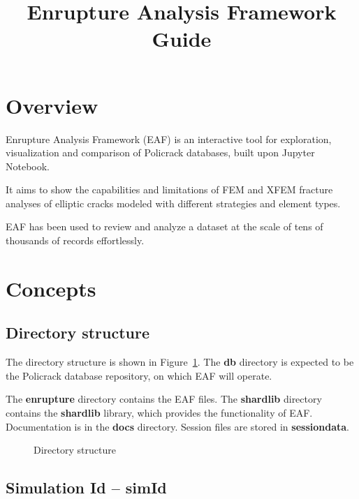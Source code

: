 \documentclass[10pt,a4paper]{article}
\begin{document}
\title{Enrupture Analysis Framework\\
Guide}
\maketitle
\vfill
\tableofcontents
\clearpage

\section{Overview}

Enrupture Analysis Framework (EAF) is an interactive tool for exploration, visualization and comparison of Policrack databases, built upon Jupyter Notebook.

It aims to show the capabilities and limitations of FEM and XFEM fracture analyses of elliptic cracks modeled with different strategies and element types.

EAF has been used to review and analyze a dataset at the scale of tens of thousands of records effortlessly.


\section{Concepts}

\subsection{Directory structure}

The directory structure is shown in Figure~\ref{directories}. The \textbf{db} directory is expected to be the Policrack database repository, on which EAF will operate.

The \textbf{enrupture} directory contains the EAF files. The \textbf{shardlib} directory contains the \textbf{shardlib} library, which provides the functionality of EAF. Documentation is in the \textbf{docs} directory. Session files are stored in \textbf{sessiondata}.


\begin{figure}[h]
  \caption{Directory structure}
  \label{directories}
\end{figure}


\subsection{Simulation Id -- \textbf{simId}}
\end{document}
